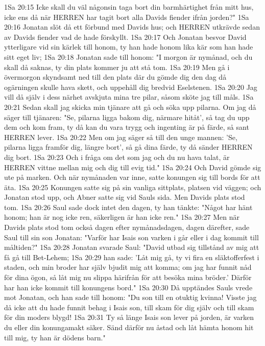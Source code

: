 1Sa 20:15  Icke skall du väl någonsin taga bort din barmhärtighet från mitt hus, icke ens då när HERREN har tagit bort alla Davids fiender ifrån jorden?"
1Sa 20:16  Jonatan slöt då ett förbund med Davids hus; och HERREN utkrävde sedan av Davids fiender vad de hade förskyllt.
1Sa 20:17  Och Jonatan besvor David ytterligare vid sin kärlek till honom, ty han hade honom lika kär som han hade sitt eget liv;
1Sa 20:18  Jonatan sade till honom: "I morgon är nymånad, och du skall då saknas, ty din plats kommer ju att stå tom.
1Sa 20:19  Men gå i övermorgon skyndsamt ned till den plats där du gömde dig den dag då ogärningen skulle hava skett, och uppehåll dig bredvid Eselstenen.
1Sa 20:20  Jag vill då själv i dess närhet avskjuta mina tre pilar, såsom sköte jag till måls.
1Sa 20:21  Sedan skall jag skicka min tjänare att gå och söka upp pilarna. Om jag då säger till tjänaren: "Se, pilarna ligga bakom dig, närmare hitåt', så tag du upp dem och kom fram, ty då kan du vara trygg och ingenting är på färde, så sant HERREN lever.
1Sa 20:22  Men om jag säger så till den unge mannen: 'Se, pilarna ligga framför dig, längre bort', så gå dina färde, ty då sänder HERREN dig bort.
1Sa 20:23  Och i fråga om det som jag och du nu hava talat, är HERREN vittne mellan mig och dig till evig tid."
1Sa 20:24  Och David gömde sig ute på marken. Och när nymånaden var inne, satte konungen sig till bords för att äta.
1Sa 20:25  Konungen satte sig på sin vanliga sittplats, platsen vid väggen; och Jonatan stod upp, och Abner satte sig vid Sauls sida. Men Davids plats stod tom.
1Sa 20:26  Saul sade dock intet den dagen, ty han tänkte: "Något har hänt honom; han är nog icke ren, säkerligen är han icke ren."
1Sa 20:27  Men när Davids plats stod tom också dagen efter nymånadsdagen, dagen därefter, sade Saul till sin son Jonatan: "Varför har Isais son varken i går eller i dag kommit till måltiden?"
1Sa 20:28  Jonatan svarade Saul: "David utbad sig tillstånd av mig att få gå till Bet-Lehem;
1Sa 20:29  han sade: 'Låt mig gå, ty vi fira en släktofferfest i staden, och min broder har själv bjudit mig att komma; om jag har funnit nåd för dina ögon, så låt mig nu slippa härifrån för att besöka mina bröder.' Därför har han icke kommit till konungens bord."
1Sa 20:30  Då upptändes Sauls vrede mot Jonatan, och han sade till honom: "Du son till en otuktig kvinna! Visste jag då icke att du hade funnit behag i Isais son, till skam för dig själv och till skam för din moders blygd!
1Sa 20:31  Ty så länge Isais son lever på jorden, är varken du eller din konungamakt säker. Sänd därför nu åstad och låt hämta honom hit till mig, ty han är dödens barn."

